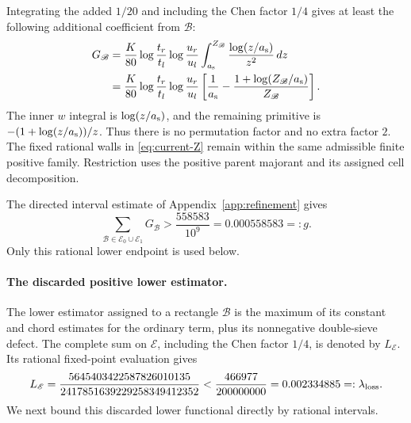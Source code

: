 Integrating the added $1/20$ and including the Chen factor $1/4$
gives at least the following additional coefficient from $\mathscr B$:
\begin{align}
 G_{\mathscr B}
 &=\frac{K}{80}
   \log\frac{t_r}{t_l}\log\frac{u_r}{u_l}
      \int_{a_{\rm s}}^{Z_{\mathscr B}}\frac{\log(z/{a_{\rm s}})}{z^2}\,dz \notag\\
 &=\frac{K}{80}
   \log\frac{t_r}{t_l}\log\frac{u_r}{u_l}
   \left[\frac1{a_{\rm s}}-\frac{1+\log(Z_{\mathscr B}/{a_{\rm s}})}{Z_{\mathscr B}}\right].
 \label{eq:current-extra-fibre}
\end{align}
The inner $w$ integral is $\log(z/{a_{\rm s}})$, and the remaining primitive
is $-(1+\log(z/{a_{\rm s}}))/z$.  Thus there is no permutation factor and
no extra factor $2$.  The fixed rational walls in
\eqref{eq:current-Z} remain within the same admissible finite
positive family.  Restriction uses the positive parent majorant and its assigned cell decomposition.

The directed interval estimate of Appendix~\ref{app:refinement} gives
\begin{equation}
 \sum_{\mathscr B\in \mathscr E_0\cup \mathscr E_1}G_{\mathscr B}>
 \frac{558583}{10^9}=0.000558583=:g.
 \label{eq:current-extra-gross}
\end{equation}
Only this rational lower endpoint is used below.

\paragraph{The discarded positive lower estimator.}
The lower estimator assigned to a rectangle $\mathscr B$ is the maximum of its
constant and chord estimates for the ordinary term, plus its nonnegative
double-sieve defect. The complete sum on $\mathscr E$, including the Chen factor
$1/4$, is denoted by $L_{\mathscr E}$. Its rational fixed-point evaluation gives
\begin{equation}
 L_{\mathscr E}=\frac{5645403422587826010135}{2417851639229258349412352}
 <\frac{466977}{200000000}=0.002334885=:\lambda_{\rm loss}.
 \label{eq:current-literal-loss}
\end{equation}
We next bound this discarded lower functional directly by rational intervals.

